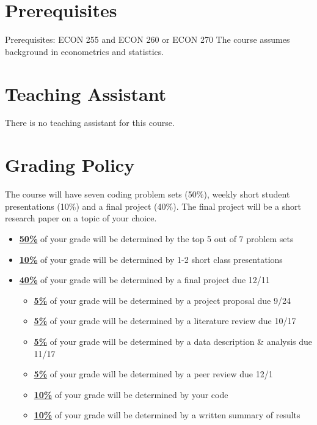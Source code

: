 \documentclass[11pt]{article}
\begin{document}
\section*{Prerequisites}
Prerequisites: ECON 255 and ECON 260 or ECON 270 The course assumes background in econometrics and statistics. 

\section*{Teaching Assistant}

There is no teaching assistant for this course. 

\section*{Grading Policy}
The course will have seven coding problem sets (50\%), weekly short student presentations (10\%) and a final project (40\%). The final project will be a short research paper on a topic of your choice. 

\begin{itemize}
	\item \underline{\textbf{50\%}} of your grade will be determined by the top 5 out of 7 problem sets
	\item \underline{\textbf{10\%}} of your grade will be determined by 1-2 short class presentations
	\item \underline{\textbf{40\%}} of your grade will be determined by a final project due 12/11
	\begin{itemize}
    \item \underline{\textbf{5\%}} of your grade will be determined by a project proposal due 9/24
    \item \underline{\textbf{5\%}} of your grade will be determined by a literature review due 10/17
    \item \underline{\textbf{5\%}} of your grade will be determined by a data description \& analysis due 11/17
    \item \underline{\textbf{5\%}} of your grade will be determined by a peer review due 12/1
    \item \underline{\textbf{10\%}} of your grade will be determined by your code
    \item \underline{\textbf{10\%}} of your grade will be determined by a written summary of results
  \end{itemize}
\end{itemize}

\end{document}
